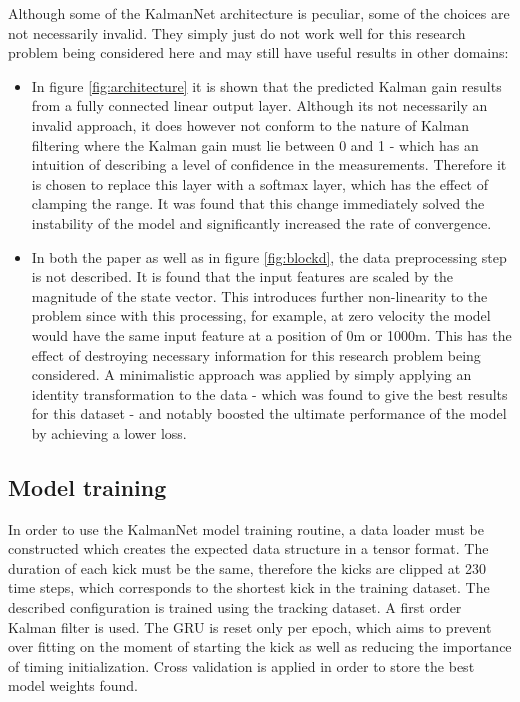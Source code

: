 \documentclass[a4paper,twoside,12pt]{report}
\begin{document}
Although some of the KalmanNet architecture is peculiar, some of the choices are not necessarily invalid. They simply just do not work well for this research problem being considered here and may still have useful results in other domains:
\begin{itemize}
    \item In figure \ref{fig:architecture} it is shown that the predicted Kalman gain results from a fully connected linear output layer. Although its not necessarily an invalid approach, it does however not conform to the nature of Kalman filtering where the Kalman gain must lie between 0 and 1 - which has an intuition of describing a level of confidence in the measurements. Therefore it is chosen to replace this layer with a softmax layer, which has the effect of clamping the range. It was found that this change immediately solved the instability of the model and significantly increased the rate of convergence.
    \item In both the paper as well as in figure \ref{fig:blockd}, the data preprocessing step is not described. It is found that the input features are scaled by the magnitude of the state vector. This introduces further non-linearity to the problem since with this processing, for example, at zero velocity the model would have the same input feature at a position of 0m or 1000m. This has the effect of destroying necessary information for this research problem being considered. A minimalistic approach was applied by simply applying an identity transformation to the data - which was found to give the best results for this dataset - and notably boosted the ultimate performance of the model by achieving a lower loss.
\end{itemize}


\subsection{Model training}

In order to use the KalmanNet model training routine, a data loader must be constructed which creates the expected data structure in a tensor format. The duration of each kick must be the same, therefore the kicks are clipped at 230 time steps, which corresponds to the shortest kick in the training dataset. The described configuration is trained using the tracking dataset. A first order Kalman filter is used. The GRU is reset only per epoch, which aims to prevent over fitting on the moment of starting the kick as well as reducing the importance of timing initialization. Cross validation is applied in order to store the best model weights found. 
\end{document}

